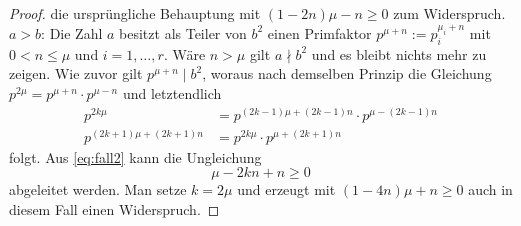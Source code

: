 \begin{proof}
die ursprüngliche Behauptung mit $(1 - 2n)\mu - n \geq 0$ zum Widerspruch. \\[4pt]
$a > b$: Die Zahl $a$ besitzt als Teiler von $b^2$ einen Primfaktor
$p^{\mu + n} := p_i^{\mu_i + n}$ mit $0 < n \leq \mu$ und $i = 1,\dotsc,r$.
Wäre $n > \mu$ gilt $a \nmid b^2$ und es bleibt nichts mehr zu zeigen.
Wie zuvor gilt $p^{\mu + n} \mid b^2$,
woraus nach demselben Prinzip die Gleichung
$p^{2\mu} = p^{\mu + n} \cdot p^{\mu - n}$
und letztendlich
\begin{align*}
\label{eq:fall2} \tag{$**$}
p^{2k\mu} & = p^{(2k - 1)\mu + (2k - 1)n} \cdot p^{\mu - (2k - 1)n} \\
p^{(2k + 1)\mu + (2k + 1)n} & = p^{2k\mu} \cdot p^{\mu + (2k + 1)n}
\end{align*}
folgt. Aus \eqref{eq:fall2} kann die Ungleichung
\begin{equation*}
\mu - 2kn + n \geq 0
\end{equation*}
abgeleitet werden. Man setze $k = 2\mu$ und erzeugt mit
$(1 - 4n)\mu + n \geq 0$ auch in diesem Fall einen Widerspruch.
\end{proof}